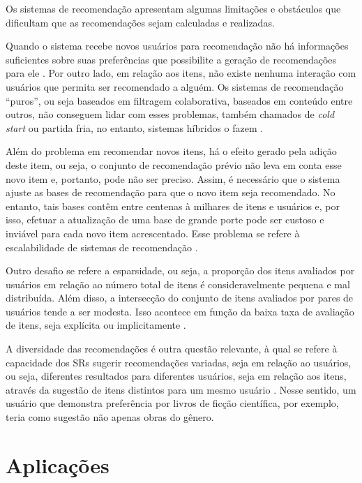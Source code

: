     Os sistemas de recomendação apresentam algumas limitações e obstáculos que dificultam que as recomendações sejam calculadas e realizadas. 
    
    Quando o sistema recebe novos usuários para recomendação não há informações suficientes sobre suas preferências que possibilite a geração de  recomendações para ele \cite{Bobadilla_2013}. Por outro lado, em relação aos itens, não existe nenhuma interação com usuários que permita ser recomendado a alguém. Os sistemas de recomendação ``puros'', ou seja baseados em filtragem colaborativa, baseados em conteúdo entre outros, não conseguem lidar com esses problemas, também chamados de \textit{cold start} ou partida fria, no entanto, sistemas híbridos o fazem \cite{Miranda2010}.
    
    Além do problema em recomendar novos itens, há o efeito gerado pela adição deste item, ou seja, o conjunto de recomendação prévio não leva em conta esse novo item e, portanto, pode não ser preciso. Assim, é necessário que o sistema ajuste as bases de recomendação para que o novo item seja recomendado. No entanto, tais bases contêm entre centenas à milhares de itens e usuários e, por isso, efetuar a atualização de uma base de grande porte pode ser custoso e inviável para cada novo item acrescentado. Esse problema se refere à escalabilidade de sistemas de recomendação \cite{Lue2012}. 
    
    Outro desafio se refere a esparsidade, ou seja, a proporção dos itens avaliados por usuários em relação ao número total de itens é consideravelmente pequena e mal distribuída. Além disso, a intersecção do conjunto de itens avaliados por pares de usuários tende a ser modesta. Isso acontece em função da baixa taxa de avaliação de itens, seja explícita ou implicitamente \cite{Lue2012, Sharma2017}.

    A diversidade das recomendações é outra questão relevante, à qual se refere à capacidade dos SRs sugerir recomendações variadas, seja em relação ao usuários, ou seja, diferentes resultados para diferentes usuários, seja em relação aos itens, através da sugestão de itens distintos para um mesmo usuário \cite{Lue2012}. Nesse sentido, um usuário que demonstra preferência por livros de ficção científica, por exemplo, teria como sugestão não apenas obras do gênero.

\section{Aplicações}

